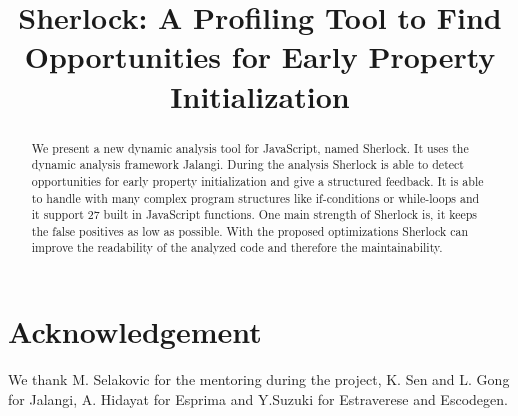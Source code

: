 \documentclass[authoryear,preprint]{sigplanconf}
\begin{document}
\setlength{\pdfpageheight}{\paperheight}
\setlength{\pdfpagewidth}{\paperwidth}


\title{Sherlock: A Profiling Tool to Find Opportunities for Early Property Initialization}


\maketitle

\begin{abstract}
We present a new dynamic analysis tool for JavaScript, named Sherlock. It uses the  dynamic analysis framework Jalangi. During the analysis Sherlock is able to detect opportunities for early property initialization and give a structured feedback. It is able to handle with many complex program structures like if-conditions or while-loops 
and it support 27 built in JavaScript functions. One main strength of Sherlock is, it keeps the false positives as low as possible. With the proposed optimizations Sherlock can improve the readability of the analyzed code and therefore the maintainability.
\end{abstract}








\section*{Acknowledgement}
We thank M. Selakovic for the mentoring during the project, K. Sen and L. Gong for Jalangi, A. Hidayat for Esprima and Y.Suzuki for Estraverese and Escodegen.




\end{document}
